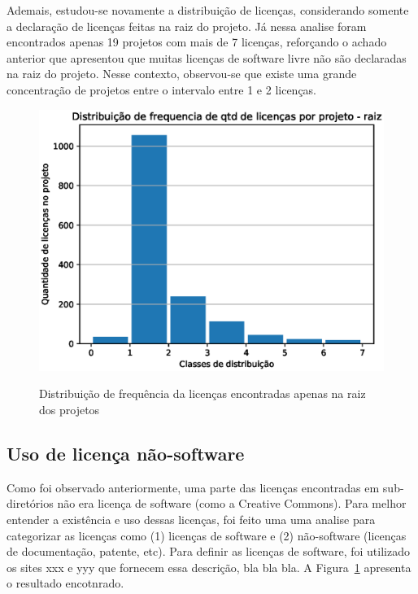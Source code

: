 Ademais, estudou-se novamente a distribuição de licenças, considerando somente a declaração de licenças feitas na raiz do projeto. 
Já nessa analise foram encontrados apenas 19 projetos com mais de 7 licenças, reforçando o achado anterior que apresentou que muitas licenças de software livre não são declaradas na raiz do projeto. 
Nesse contexto, observou-se que existe uma grande concentração de projetos entre o intervalo entre 1 e 2 licenças.

\begin{figure}[H]
    \centering
    \caption{Distribuição de frequência da licenças encontradas apenas na raiz dos projetos}
    \includegraphics[scale=0.8]{figuras/resultados/hit_qtd_raiz.eps}
    \label{local-licencas-raiz}
\end{figure}


\subsection{Uso de licença não-software} 


Como foi observado anteriormente, uma parte das licenças encontradas em sub-diretórios não era licença de software (como a Creative Commons). Para melhor entender a existência e uso dessas licenças, foi feito uma uma analise para categorizar as licenças como (1) licenças de software e (2) não-software (licenças de documentação, patente, etc). Para definir as licenças de software, foi utilizado os sites xxx e yyy que fornecem essa descrição, bla bla bla. A Figura~\ref{local-licencas-raiz} apresenta o resultado encotnrado.



